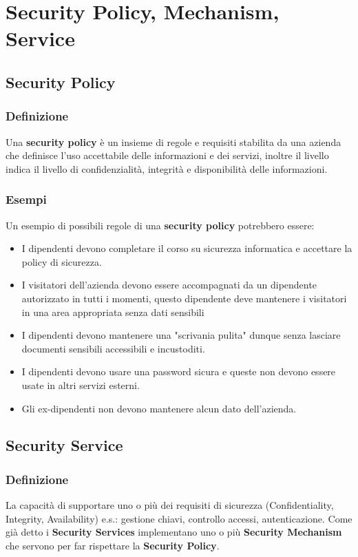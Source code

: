 \section{Security Policy, Mechanism, Service}
    \subsection{Security Policy}
            \subsubsection{Definizione}
                Una \textbf{security policy} è un insieme di regole e requisiti stabilita da una azienda che definisce l'uso accettabile delle informazioni e dei servizi, inoltre il livello indica il livello di confidenzialità, integrità e disponibilità delle informazioni.
            \subsubsection{Esempi}
                Un esempio di possibili regole di una \textbf{security policy} potrebbero essere:
                \begin{itemize}
                    \item I dipendenti devono completare il corso su sicurezza informatica e accettare la policy di sicurezza.
                    \item I visitatori dell'azienda devono essere accompagnati da un dipendente autorizzato in tutti i momenti, questo dipendente deve mantenere i visitatori in una area appropriata senza dati sensibili
                    \item I dipendenti devono mantenere una "scrivania pulita" dunque senza lasciare documenti sensibili accessibili e incustoditi.
                    \item I dipendenti devono usare una password sicura e queste non devono essere usate in altri servizi esterni.
                    \item Gli ex-dipendenti non devono mantenere alcun dato dell'azienda.
                \end{itemize}
    \subsection{Security Service}
            \subsubsection{Definizione} La capacità di supportare uno o più dei requisiti di sicurezza (Confidentiality, Integrity, Availability) e.s.: gestione chiavi, controllo accessi, autenticazione.
                Come già detto i \textbf{Security Services} implementano uno o più \textbf{Security Mechanism} che servono per far rispettare la \textbf{Security Policy}.
